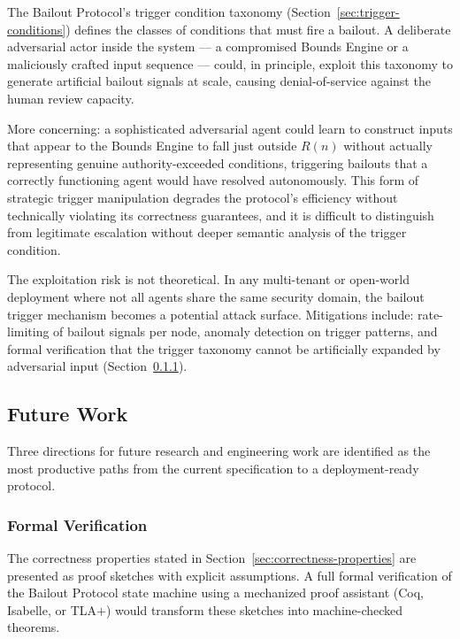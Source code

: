 The Bailout Protocol's trigger condition taxonomy (Section~\ref{sec:trigger-conditions}) defines the classes of conditions that must fire a bailout. A deliberate adversarial actor inside the system --- a compromised Bounds Engine or a maliciously crafted input sequence --- could, in principle, exploit this taxonomy to generate artificial bailout signals at scale, causing denial-of-service against the human review capacity.

More concerning: a sophisticated adversarial agent could learn to construct inputs that appear to the Bounds Engine to fall just outside $R(n)$ without actually representing genuine authority-exceeded conditions, triggering bailouts that a correctly functioning agent would have resolved autonomously. This form of strategic trigger manipulation degrades the protocol's efficiency without technically violating its correctness guarantees, and it is difficult to distinguish from legitimate escalation without deeper semantic analysis of the trigger condition.

The exploitation risk is not theoretical. In any multi-tenant or open-world deployment where not all agents share the same security domain, the bailout trigger mechanism becomes a potential attack surface. Mitigations include: rate-limiting of bailout signals per node, anomaly detection on trigger patterns, and formal verification that the trigger taxonomy cannot be artificially expanded by adversarial input (Section~\ref{sec:formal-verification}).

\subsection{Future Work}\label{sec:future-work}

Three directions for future research and engineering work are identified as the most productive paths from the current specification to a deployment-ready protocol.

\subsubsection{Formal Verification}\label{sec:formal-verification}

The correctness properties stated in Section~\ref{sec:correctness-properties} are presented as proof sketches with explicit assumptions. A full formal verification of the Bailout Protocol state machine using a mechanized proof assistant (Coq, Isabelle, or TLA$+$) would transform these sketches into machine-checked theorems.

